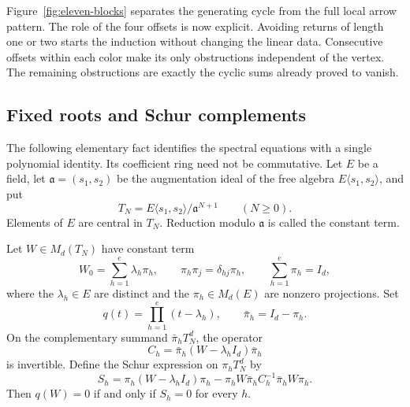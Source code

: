 Figure~\ref{fig:eleven-blocks} separates the generating cycle from the
full local arrow pattern. The role of the four offsets is now explicit.  Avoiding returns of length
one or two starts the induction without changing the linear data.
Consecutive offsets within each color make its only obstructions
independent of the vertex.  The remaining obstructions are exactly the
cyclic sums already proved to vanish.

\subsection{Fixed roots and Schur complements}

The following elementary fact identifies the spectral equations with a
single polynomial identity. Its coefficient ring need not be commutative.
Let $E$ be a field, let $\mathfrak a=(s_1,s_2)$ be the augmentation ideal
of the free algebra $E\langle s_1,s_2\rangle$, and put
\[
  T_N=E\langle s_1,s_2\rangle/\mathfrak a^{N+1}
  \qquad (N\geq 0).
\]
Elements of $E$ are central in $T_N$. Reduction modulo $\mathfrak a$
is called the constant term.

\begin{lemma}\label{lem:schur-polynomial}
Let $W\in M_d(T_N)$ have constant term
\[
  W_0=\sum_{h=1}^{e}\lambda_h\pi_h,
  \qquad
  \pi_h\pi_j=\delta_{hj}\pi_h,
  \qquad
  \sum_{h=1}^{e}\pi_h=I_d,
\]
where the $\lambda_h\in E$ are distinct and the $\pi_h\in M_d(E)$
are nonzero projections. Set
\[
  q(t)=\prod_{h=1}^{e}(t-\lambda_h),
  \qquad \bar\pi_h=I_d-\pi_h.
\]
On the complementary summand $\bar\pi_h T_N^d$, the operator
\[
  C_h=\bar\pi_h(W-\lambda_h I_d)\bar\pi_h
\]
is invertible. Define the Schur expression on $\pi_h T_N^d$ by
\[
  S_h=\pi_h(W-\lambda_h I_d)\pi_h
      -\pi_hW\bar\pi_h C_h^{-1}\bar\pi_hW\pi_h.
\]
Then $q(W)=0$ if and only if $S_h=0$ for every $h$.
\end{lemma}

